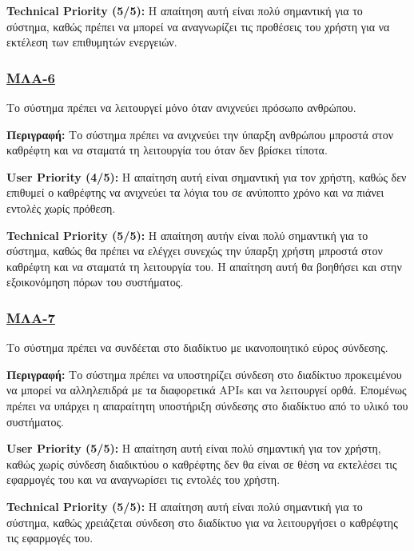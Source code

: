\noindent\textbf{Technical Priority (5/5):} Η απαίτηση αυτή είναι πολύ σημαντική για το σύστημα, καθώς πρέπει να μπορεί να αναγνωρίζει τις προθέσεις του χρήστη για να εκτέλεση των επιθυμητών ενεργειών.

\subsubsection{\underline{ΜΛΑ-6}}
\noindent Το σύστημα πρέπει να λειτουργεί μόνο όταν ανιχνεύει πρόσωπο ανθρώπου.

\noindent\textbf{Περιγραφή:} Το σύστημα πρέπει να ανιχνεύει την ύπαρξη ανθρώπου μπροστά στον καθρέφτη και να σταματά τη λειτουργία του όταν δεν βρίσκει τίποτα.

\noindent\textbf{User Priority (4/5):} Η απαίτηση αυτή είναι σημαντική για τον χρήστη, καθώς δεν επιθυμεί ο καθρέφτης να ανιχνεύει τα λόγια του σε ανύποπτο χρόνο και να πιάνει εντολές χωρίς πρόθεση.

\noindent\textbf{Technical Priority (5/5):} Η απαίτηση αυτήν είναι πολύ σημαντική για το σύστημα, καθώς θα πρέπει να ελέγχει συνεχώς την ύπαρξη χρήστη μπροστά στον καθρέφτη και να σταματά τη λειτουργία του. Η απαίτηση αυτή θα βοηθήσει και στην εξοικονόμηση πόρων του συστήματος.

\subsubsection{\underline{ΜΛΑ-7}}
\noindent Το σύστημα πρέπει να συνδέεται στο διαδίκτυο με ικανοποιητικό εύρος σύνδεσης.

\noindent\textbf{Περιγραφή:} Το σύστημα πρέπει να υποστηρίζει σύνδεση στο διαδίκτυο προκειμένου να μπορεί να αλληλεπιδρά με τα διαφορετικά APIs και να λειτουργεί ορθά. Επομένως πρέπει να υπάρχει η απαραίτητη υποστήριξη σύνδεσης στο διαδίκτυο από το υλικό του συστήματος.

\noindent\textbf{User Priority (5/5):} Η απαίτηση αυτή είναι πολύ σημαντική για τον χρήστη, καθώς χωρίς σύνδεση διαδικτύου ο καθρέφτης δεν θα είναι σε θέση να εκτελέσει τις εφαρμογές του και να αναγνωρίσει τις εντολές του χρήστη.

\noindent\textbf{Technical Priority (5/5):} Η απαίτηση αυτή είναι πολύ σημαντική για το σύστημα, καθώς χρειάζεται σύνδεση στο διαδίκτυο για να λειτουργήσει ο καθρέφτης τις εφαρμογές του. 